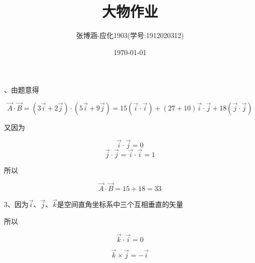 \documentclass{article}
\title{大物作业}
\author{张博涵-应化1903(学号:1912020312)}
\date{\today}
\begin{document}
	、由题意得
	
	$$\vec { A } \cdot \vec { B }=(3\vec { i }+2\vec { j })\cdot(5\vec { i }+9\vec { j })=15(\vec { i }\cdot\vec { i })+(27+10)\vec { i }\cdot\vec { j }+18(\vec { j }\cdot\vec { j })$$
	
	又因为
	
	$$\vec { i } \cdot \vec { j }=0$$
	$$\vec { j }\cdot\vec { j }=\vec { i }\cdot\vec { i }=1$$
	
	所以
	
	$$\vec { A } \cdot \vec { B }=15+18=33$$
	
	3、因为$\vec { i }$、$\vec { j }$、$\vec { k }$是空间直角坐标系中三个互相垂直的矢量
	
	所以
	
	$$\vec { k }\cdot\vec { i }=0$$
	
	$$\vec { k }\times\vec { j }=-\vec { i }$$
	
\end{document}
